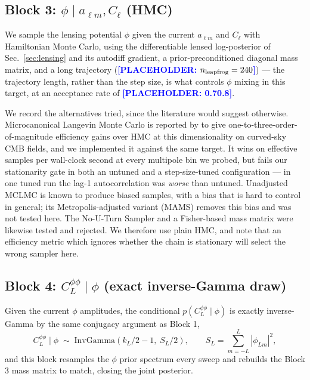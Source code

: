 \documentclass[twocolumn,superscriptaddress,aps,prl,floatfix]{revtex4-2}
\newcommand{\alm}{a_{\ell m}}
\newcommand{\cl}{C_\ell}
\newcommand{\clpp}{C_L^{\phi\phi}}
\newcommand{\placeholder}[1]{\textcolor{blue}{\textbf{[PLACEHOLDER: #1]}}}
\begin{document}
\subsection{Block 3: $\phi \mid \alm, \cl$ (HMC)}
\label{sec:block3}

We sample the lensing potential $\phi$ given the current $\alm$ and $\cl$ with
Hamiltonian Monte Carlo, using the differentiable lensed log-posterior of
Sec.~\ref{sec:lensing} and its autodiff gradient, a prior-preconditioned
diagonal mass matrix, and a long trajectory
(\placeholder{$n_{\rm leapfrog} = 240$}) --- the trajectory length, rather than
the step size, is what controls $\phi$ mixing in this target, at an acceptance
rate of \placeholder{0.7\text{--}0.8}.

We record the alternatives tried, since the literature would suggest otherwise.
Microcanonical Langevin Monte Carlo \citep{Robnik:2022} is reported by
\citet{Bayer:2023,Flinch} to give one-to-three-order-of-magnitude efficiency
gains over HMC at this dimensionality on curved-sky CMB fields, and we
implemented it against the same target. It wins on effective samples per
wall-clock second at every multipole bin we probed, but fails our stationarity
gate in both an untuned and a step-size-tuned configuration --- in one tuned run
the lag-1 autocorrelation was \emph{worse} than untuned. Unadjusted MCLMC is
known to produce biased samples, with a bias that is hard to control in
general; its Metropolis-adjusted variant (MAMS) removes this bias
\citep{Robnik:2025} and was not tested here. The No-U-Turn Sampler
and a Fisher-based mass matrix were likewise tested and rejected. We therefore
use plain HMC, and note that an efficiency metric which ignores whether the
chain is stationary will select the wrong sampler here.

\subsection{Block 4: $\clpp \mid \phi$ (exact inverse-Gamma draw)}
\label{sec:block4}

Given the current $\phi$ amplitudes, the conditional $p(\clpp \mid \phi)$ is
exactly inverse-Gamma by the same conjugacy argument as Block 1,
\begin{equation}
  \clpp \mid \phi \;\sim\; \mathrm{InvGamma}\!\left(k_L/2 - 1,\; S_L/2\right),
  \qquad S_L = \sum_{m=-L}^{L} |\phi_{Lm}|^2 ,
  \label{eq:block4}
\end{equation}
and this block resamples the $\phi$ prior spectrum every sweep and rebuilds the
Block 3 mass matrix to match, closing the joint posterior.
\end{document}

